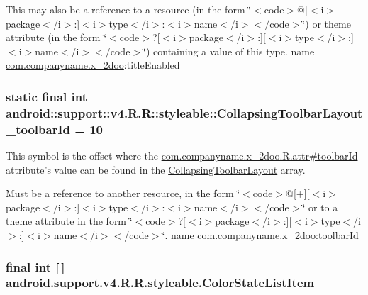 This may also be a reference to a resource (in the form \char`\"{}$<$code$>$@\mbox{[}$<$i$>$package$<$/i$>$:\mbox{]}$<$i$>$type$<$/i$>$:$<$i$>$name$<$/i$>$$<$/code$>$\char`\"{}) or theme attribute (in the form \char`\"{}$<$code$>$?\mbox{[}$<$i$>$package$<$/i$>$:\mbox{]}\mbox{[}$<$i$>$type$<$/i$>$:\mbox{]}$<$i$>$name$<$/i$>$$<$/code$>$\char`\"{}) containing a value of this type.  name \hyperlink{namespacecom_1_1companyname_1_1x__2doo}{com.companyname.x\_\-2doo}:titleEnabled \hypertarget{classandroid_1_1support_1_1v4_1_1_r_1_1styleable_9f99f544b90e15c7d36234462470e3f7}{
\subsubsection[{CollapsingToolbarLayout\_\-toolbarId}]{\setlength{\rightskip}{0pt plus 5cm}static final int android::support::v4.R.R::styleable::CollapsingToolbarLayout\_\-toolbarId = 10}}
\label{classandroid_1_1support_1_1v4_1_1_r_1_1styleable_9f99f544b90e15c7d36234462470e3f7}


This symbol is the offset where the \hyperlink{classcom_1_1companyname_1_1x__2doo_1_1_r_1_1attr_fd9b34624e9d0708534d23b4f1752285}{com.companyname.x\_\-2doo.R.attr\#toolbarId} attribute's value can be found in the \hyperlink{classandroid_1_1support_1_1v4_1_1_r_1_1styleable_aa101903fcf4b45a3b7fee0a0abc5ea8}{CollapsingToolbarLayout} array.

Must be a reference to another resource, in the form \char`\"{}$<$code$>$@\mbox{[}+\mbox{]}\mbox{[}$<$i$>$package$<$/i$>$:\mbox{]}$<$i$>$type$<$/i$>$:$<$i$>$name$<$/i$>$$<$/code$>$\char`\"{} or to a theme attribute in the form \char`\"{}$<$code$>$?\mbox{[}$<$i$>$package$<$/i$>$:\mbox{]}\mbox{[}$<$i$>$type$<$/i$>$:\mbox{]}$<$i$>$name$<$/i$>$$<$/code$>$\char`\"{}.  name \hyperlink{namespacecom_1_1companyname_1_1x__2doo}{com.companyname.x\_\-2doo}:toolbarId \hypertarget{classandroid_1_1support_1_1v4_1_1_r_1_1styleable_47476cf7ffe4d9c8245bd3670938eac6}{
\subsubsection[{ColorStateListItem}]{\setlength{\rightskip}{0pt plus 5cm}final int \mbox{[}$\,$\mbox{]} android.support.v4.R.R.styleable.ColorStateListItem}}
\label{classandroid_1_1support_1_1v4_1_1_r_1_1styleable_47476cf7ffe4d9c8245bd3670938eac6}


